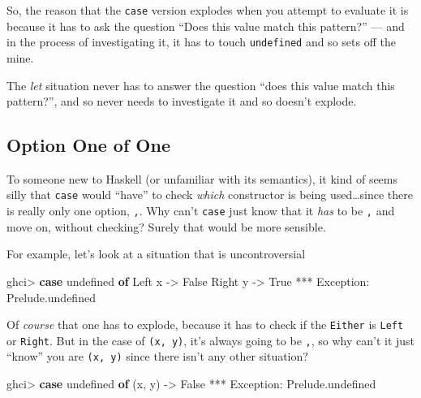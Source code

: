 \documentclass[]{article}
\newenvironment{Shaded}{}{}
\newcommand{\DataTypeTok}[1]{\textcolor[rgb]{0.56,0.13,0.00}{#1}}
\newcommand{\FunctionTok}[1]{\textcolor[rgb]{0.02,0.16,0.49}{#1}}
\newcommand{\KeywordTok}[1]{\textcolor[rgb]{0.00,0.44,0.13}{\textbf{#1}}}
\newcommand{\NormalTok}[1]{#1}
\newcommand{\OperatorTok}[1]{\textcolor[rgb]{0.40,0.40,0.40}{#1}}
\newcommand{\OtherTok}[1]{\textcolor[rgb]{0.00,0.44,0.13}{#1}}
\begin{document}
So, the reason that the \texttt{case} version explodes when you attempt to
evaluate it is because it has to ask the question ``Does this value match this
pattern?'' --- and in the process of investigating it, it has to touch
\texttt{undefined} and so sets off the mine.

The \emph{let} situation never has to answer the question ``does this value
match this pattern?'', and so never needs to investigate it and so doesn't
explode.

\subsection{Option One of One}\label{option-one-of-one}

To someone new to Haskell (or unfamiliar with its semantics), it kind of seems
silly that \texttt{case} would ``have'' to check \emph{which} constructor is
being used\ldots since there is really only one option, \texttt{,}. Why can't
\texttt{case} just know that it \emph{has} to be \texttt{,} and move on, without
checking? Surely that would be more sensible.

For example, let's look at a situation that is uncontroversial

\begin{Shaded}
\begin{Highlighting}[]
\NormalTok{ghci}\OperatorTok{\textgreater{}} \KeywordTok{case} \FunctionTok{undefined} \KeywordTok{of}
        \DataTypeTok{Left}\NormalTok{ x }\OtherTok{{-}\textgreater{}} \DataTypeTok{False}
        \DataTypeTok{Right}\NormalTok{ y }\OtherTok{{-}\textgreater{}} \DataTypeTok{True}
\OperatorTok{***} \DataTypeTok{Exception}\OperatorTok{:}\NormalTok{ Prelude.undefined}
\end{Highlighting}
\end{Shaded}

Of \emph{course} that one has to explode, because it has to check if the
\texttt{Either} is \texttt{Left} or \texttt{Right}. But in the case of
\texttt{(x,\ y)}, it's always going to be \texttt{,}, so why can't it just
``know'' you are \texttt{(x,\ y)} since there isn't any other situation?

\begin{Shaded}
\begin{Highlighting}[]
\NormalTok{ghci}\OperatorTok{\textgreater{}} \KeywordTok{case} \FunctionTok{undefined} \KeywordTok{of}
\NormalTok{        (x, y) }\OtherTok{{-}\textgreater{}} \DataTypeTok{False}
\OperatorTok{***} \DataTypeTok{Exception}\OperatorTok{:}\NormalTok{ Prelude.undefined}
\end{Highlighting}
\end{Shaded}
\end{document}
